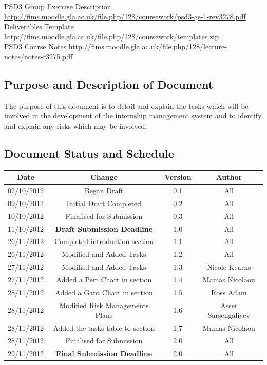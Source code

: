 \documentclass{l3deliverable}
\begin{document}
{{PSD3 Group Exercise Description \url{http://fims.moodle.gla.ac.uk/file.php/128/coursework/psd3-ge-1-rev3278.pdf}}\\

Deliverables Template \url{http://fims.moodle.gla.ac.uk/file.php/128/coursework/templates.zip}\\

PSD3 Course Notes \url{http://fims.moodle.gla.ac.uk/file.php/128/lecture-notes/notes-r3275.pdf}\\

\subsection{Purpose and Description of Document}

The purpose of this document is to detail and explain the tasks which will be involved in the development of the internship management system and to identify and explain any risks which may be involved.

\subsection{Document Status and Schedule}

\begin{center}{
\begin{tabular}{|c|c|c|c|}
\hline \textbf{Date} &\textbf{Change} & \textbf{Version} & \textbf{Author}\\ 
\hline 02/10/2012 & Began Draft & 0.1 & All \\ 
\hline 09/10/2012 & Initial Draft Completed & 0.2 & All \\ 
\hline 10/10/2012 & Finalised for Submission & 0.3 & All\\ 
\hline 11/10/2012 & \textbf{Draft Submission Deadline} & 1.0 & All\\ 
\hline
\hline 26/11/2012 & Completed introduction section & 1.1 & All\\
\hline 26/11/2012 & Modified and Added Tasks & 1.2 & All\\ 
\hline 27/11/2012 & Modified and Added Tasks & 1.3 & Nicole Kearns\\
\hline 27/11/2012 & Added a Pert Chart in section& 1.4 & Mamas Nicolaou\\
\hline 28/11/2012 & Added a Gant Chart in section& 1.5 & Ross Adam\\
\hline 28/11/2012 & Modified Risk Managements Plans&1.6 & Asset Sarsengaliyev\\
\hline 28/11/2012 & Added the tasks table to section& 1.7&Mamas Nicolaou\\
\hline 28/11/2012 & Finalised for Submission &2.0& All\\
\hline 29/11/2012 & \textbf{Final Submission Deadline} &2.0  & All\\ 
\hline 
\end{tabular} }
\end{center}

}
\end{document}
